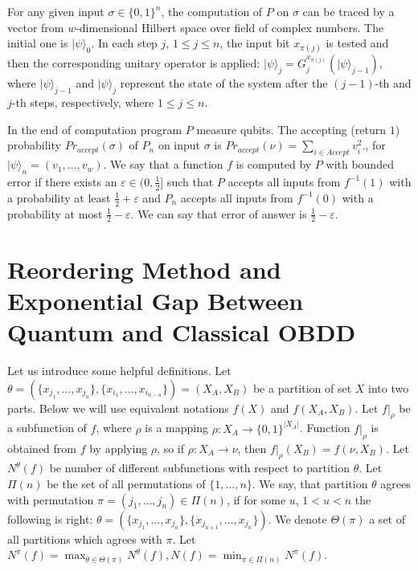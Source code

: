 \documentclass{llncs}
\newcommand{\ket}[1]{|#1\rangle}
\begin{document}
  For any given input $ \sigma \in  \{0,1\}^n $, the computation of $P$ on $\sigma$ can be traced by  a vector from $ w$-dimensional Hilbert space over field of complex numbers. The initial one is $ \ket{\psi}_0$. In each step $j$, $1 \leq j \leq n$, the input bit $ x_{\pi(j)} $ is tested and then the corresponding unitary operator is applied:
$
	\ket{\psi}_j = G_j^{x_{\pi(j)}} (\ket{\psi}_{j-1}),
$ 
where $ \ket{\psi}_{j-1} $ and $ \ket{\psi}_j $ represent the state of the system after the $ (j-1)$-th  and $ j$-th steps, respectively, where $ 1 \leq j \leq n $.


In the end of computation program $P$ measure qubits. The accepting (return $1$) probability $Pr_{accept}(\sigma)$ of $ P_n $ on input $ \sigma $ is 
$
	Pr_{accept}(\nu)=\sum_{i \in Accept} v^2_i.
$, for $ \ket{\psi}_n=(v_1,\dots,v_w)$.
We say that a function $f$ is computed by $ P$ with bounded error if there exists an $ \varepsilon \in (0,\frac{1}{2}] $ such that $ P$ accepts all inputs from $ f^{-1}(1) $ with a probability at least $ \frac{1}{2}+\varepsilon $ and $ P_n $ accepts all inputs from $ f^{-1}(0) $ with a probability at most $ \frac{1}{2}-\varepsilon $.  We can say that error of answer is $\frac{1}{2}-\varepsilon$.


\section{Reordering Method and Exponential Gap Between Quantum and Classical OBDD}\label{sec:deord}
Let us introduce some helpful definitions.
Let $\theta=(\{x_{j_1},\dots, x_{j_u}\}, \{x_{i_1},\dots, x_{i_{n-u}}\})=(X_A,X_B)$
 be a partition of set $X$ into two parts. Below we will use equivalent notations $f(X)$ and $f(X_A, X_B)$.
Let  $f|_\rho$ be a subfunction of $f$, where  $\rho$ is a mapping $\rho:X_A \to \{0,1\}^{|X_A|}$.
Function $f|_\rho$ is obtained from $f$ by applying $\rho$, so if $\rho:X_A\to \nu$, then $f|_\rho(X_B)=f(\nu,X_B)$. Let $N^\theta(f)$  be number of different subfunctions with respect to partition $\theta$. 
Let $\Pi(n)$ be the set of all permutations of $\{1,\dots,n\}$.
We say, that  partition $\theta$ agrees with permutation
$\pi=(j_1,\dots, j_n)\in \Pi(n)$, if for some $u$, $1<u<n$ the
following is right: $\theta=(\{x_{j_1},\dots,
x_{j_u}\},\{x_{j_{u+1}},\dots, x_{j_n}\})$. We denote $\Theta(\pi)$
a set of all partitions which agrees with $\pi$. 
Let $ N^\pi(f)=  \max_{\theta\in \Theta(\pi)} N^\theta(f),
N(f)=\min_{\pi\in \Pi(n)}N^\pi(f)$.

\end{document}
